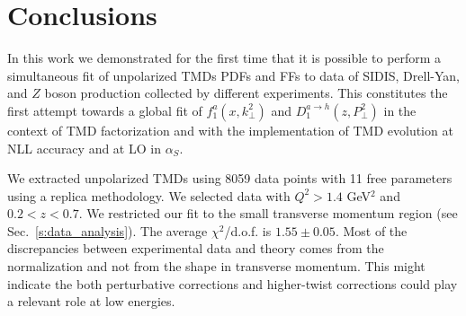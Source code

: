 \documentclass[aps,preprintnumbers,showpacs,nofootinbib,superscriptaddress,floatfix]{revtex4}
\begin{document}





\section{Conclusions}
\label{s:conclusions}


In this work we demonstrated for the first time that it is possible 
to perform a
simultaneous fit of unpolarized TMDs PDFs and FFs 
to data of SIDIS, Drell-Yan, and $Z$
boson production collected by different experiments. 
This constitutes the first attempt towards a global fit of 
$f_1^a(x,k_\perp^2)$ and $D_1^{a \to h}(z,P_\perp^2)$ in the context of TMD
factorization and with the implementation of 
TMD evolution at NLL accuracy and at LO in $\alpha_S$.
  
We extracted unpolarized TMDs using 8059 data points with 11 free parameters
using a replica methodology. We selected data with 
$Q^2 > 1.4$ GeV$^2$ and $0.2 < z < 0.7$. We restricted our fit to the small
transverse momentum region
(see Sec.~\ref{s:data_analysis}).  
The average $\chi^2$/d.o.f. is $1.55 \pm 0.05$.
Most of the discrepancies between experimental data and theory comes from the
normalization and not from the shape in transverse momentum. This might
indicate the both perturbative corrections and higher-twist corrections could
play a relevant role at low energies. 
\end{document}
